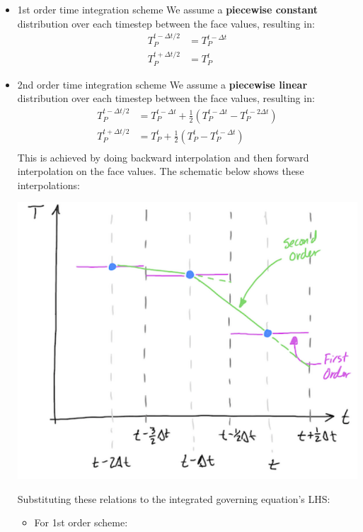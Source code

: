 \documentclass[11pt]{article}
\begin{document}
\begin{itemize}
\item 1st order time integration scheme
We assume a \textbf{piecewise constant} distribution over each timestep between the face values, resulting in:
\begin{align*}
T_P^{t-\Delta t /2 } &= T_P^{t-\Delta t }\\
T_P^{t+\Delta t /2 } &= T_P^{t}
\end{align*}
\item 2nd order time integration scheme
We assume a \textbf{piecewise linear} distribution over each timestep between the face values, resulting in:
\begin{align*}
T_P^{t-\Delta t /2} &= T_P^{t-\Delta t } + \frac{1}{2}(T_P^{t-\Delta t} - T_P^{t-2\Delta t})\\
T_P^{t+\Delta t /2} &= T_P^{t} + \frac{1}{2}(T_P^{t} - T_P^{t-\Delta t})\\
\end{align*}
This is achieved by doing backward interpolation and then forward interpolation on the face values.
The schematic below shows these interpolations:
\begin{center}
\includegraphics[scale=0.5]{../pic/2nd_order_implicit_interpolation.png}
\end{center}
Substituting these relations to the integrated governing equation's LHS:
\begin{itemize}
\item For 1st order scheme:
\begin{equation}

\end{equation}
\end{itemize}
\end{itemize}
\end{document}
